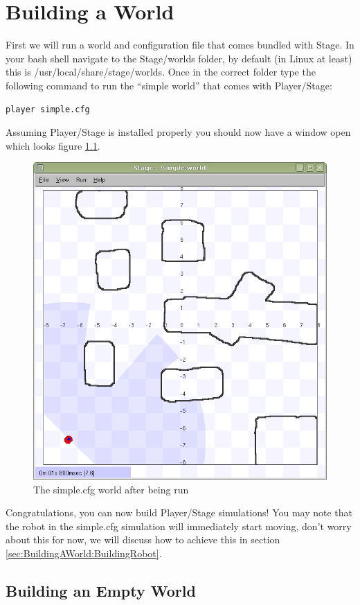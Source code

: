 \documentclass[a4paper]{report}
\newcommand{\plst}{Player/Stage\xspace}
\begin{document}
\chapter{Building a World} \label{sec:BuildingAWorld}

First we will run a world and configuration file that comes bundled with Stage. In your bash shell navigate to the Stage/worlds folder, by default (in Linux at least) this is /usr/local/share/stage/worlds. Once in the correct folder type the following command to run the ``simple world'' that comes with \plst:
\begin{verbatim}
player simple.cfg
\end{verbatim}
Assuming \plst is installed properly you should now have a window open which looks figure \ref{fig:BuildingAWorld:SimpleWorld}.
\begin{figure}
	\centering
	\includegraphics[width=0.8\linewidth]{./pics/simpleworld.png}
	\caption{The simple.cfg world after being run}
	\label{fig:BuildingAWorld:SimpleWorld}
\end{figure}

Congratulations, you can now build Player/Stage simulations! You may note that the robot in the simple.cfg simulation will immediately start moving, don't worry about this for now, we will discuss how to achieve this in section \ref{sec:BuildingAWorld:BuildingRobot}.


\section{Building an Empty World} \label{sec:BuildingAWorld:EmptyWorld}
\end{document}

